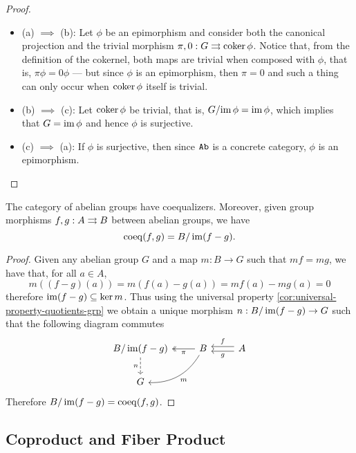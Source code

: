 \begin{proof}
\begin{itemize}\setlength\itemsep{0em}
\item (a) \(\implies\) (b): Let \(\phi\) be an epimorphism and consider both the
  canonical projection and the trivial morphism
  \(\pi, 0: G \rightrightarrows \operatorname{coker} \phi\). Notice that, from the definition
  of the cokernel, both maps are trivial when composed with \(\phi\), that is,
  \(\pi \phi = 0 \phi\) --- but since \(\phi\) is an epimorphism, then
  \(\pi = 0\) and such a thing can only occur when \(\operatorname{coker} \phi\) itself is
  trivial.

\item (b) \(\implies\) (c): Let \(\operatorname{coker} \phi\) be trivial, that is,
  \(G/{\operatorname{im} \phi} = \operatorname{im} \phi\), which implies that \(G = \operatorname{im} \phi\) and hence
  \(\phi\) is surjective.

\item (c) \(\implies\) (a): If \(\phi\) is surjective, then since \(\Ab\) is a
  concrete category, \(\phi\) is an epimorphism.
\end{itemize}
\end{proof}

\begin{proposition}[Coequalizers in \(\Ab\)]
\label{prop:coequalizer-Ab}
The category of abelian groups have coequalizers. Moreover, given group
morphisms \(f, g: A \rightrightarrows B\) between abelian groups, we have
\[
\operatorname{coeq}(f, g) = B/\operatorname{im}(f - g).
\]
\end{proposition}

\begin{proof}
Given any abelian group \(G\) and a map \(m: B \to G\) such that \(m f = m g\),
we have that, for all \(a \in A\),
\[
m((f - g)(a)) = m(f(a) - g(a)) = m f(a) - m g(a) = 0
\]
therefore \(\operatorname{im}(f - g) \subseteq \ker m\). Thus using the universal property
\cref{cor:universal-property-quotients-grp} we obtain a unique morphism \(n:
B/\operatorname{im}(f - g) \to G\) such that the following diagram commutes
\[
\begin{tikzcd}
B/\im(f - g) \ar[d, dashed, "n"']
&B \ar[l, two heads, "\pi"] \ar[ld, bend left, "m"]
&A \ar[l, shift right, "f"'] \ar[l, shift left, "g"] \\
G & &
\end{tikzcd}
\]
Therefore \(B/\operatorname{im}(f - g) = \operatorname{coeq}(f, g)\).
\end{proof}

\subsection{Coproduct and Fiber Product}


